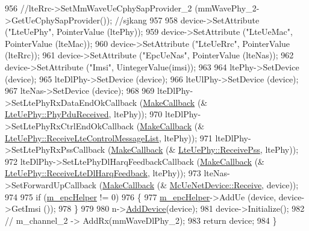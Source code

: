 \begin{DoxyCode}
956         \textcolor{comment}{//lteRrc->SetMmWaveUeCphySapProvider\_2 (mmWavePhy\_2->GetUeCphySapProvider()); //sjkang}
957 
958         device->SetAttribute (\textcolor{stringliteral}{"LteUePhy"}, PointerValue (ltePhy));
959         device->SetAttribute (\textcolor{stringliteral}{"LteUeMac"}, PointerValue (lteMac));
960         device->SetAttribute (\textcolor{stringliteral}{"LteUeRrc"}, PointerValue (lteRrc));
961         device->SetAttribute (\textcolor{stringliteral}{"EpcUeNas"}, PointerValue (lteNas));
962         device->SetAttribute (\textcolor{stringliteral}{"Imsi"}, UintegerValue(imsi));
963 
964         ltePhy->SetDevice (device);
965         lteDlPhy->SetDevice (device);
966         lteUlPhy->SetDevice (device);
967         lteNas->SetDevice (device);
968 
969         lteDlPhy->SetLtePhyRxDataEndOkCallback (\hyperlink{group__makecallbackmemptr_ga9376283685aa99d204048d6a4b7610a4}{MakeCallback} (&
      \hyperlink{classns3_1_1LteUePhy_ac78ec37217590a6cec1e0ca89f7014f9}{LteUePhy::PhyPduReceived}, ltePhy));
970         lteDlPhy->SetLtePhyRxCtrlEndOkCallback (\hyperlink{group__makecallbackmemptr_ga9376283685aa99d204048d6a4b7610a4}{MakeCallback} (&
      \hyperlink{classns3_1_1LteUePhy_aa7bd315ac9c8f49652624c8d1f1b03ef}{LteUePhy::ReceiveLteControlMessageList}, ltePhy));
971         lteDlPhy->SetLtePhyRxPssCallback (\hyperlink{group__makecallbackmemptr_ga9376283685aa99d204048d6a4b7610a4}{MakeCallback} (&
      \hyperlink{classns3_1_1LteUePhy_a2727abdb8f0559d6bc67349d9089723d}{LteUePhy::ReceivePss}, ltePhy));
972         lteDlPhy->SetLtePhyDlHarqFeedbackCallback (\hyperlink{group__makecallbackmemptr_ga9376283685aa99d204048d6a4b7610a4}{MakeCallback} (&
      \hyperlink{classns3_1_1LteUePhy_a46e7ead3dd806585ba62afdda8b90bb2}{LteUePhy::ReceiveLteDlHarqFeedback}, ltePhy));
973         lteNas->SetForwardUpCallback (\hyperlink{group__makecallbackmemptr_ga9376283685aa99d204048d6a4b7610a4}{MakeCallback} (&
      \hyperlink{classns3_1_1McUeNetDevice_ad4fd6a0c68cb71e07a6bc4921f12fb7e}{McUeNetDevice::Receive}, device));
974 
975         \textcolor{keywordflow}{if} (\hyperlink{classns3_1_1MmWaveHelper_a03b33f9a2480a4cdd8ffe697ccc08e9e}{m\_epcHelper} != 0)
976         \{
977                 \hyperlink{classns3_1_1MmWaveHelper_a03b33f9a2480a4cdd8ffe697ccc08e9e}{m\_epcHelper}->AddUe (device, device->GetImsi ());
978         \}
979 
980         n->\hyperlink{classns3_1_1Node_a42ff83ee1d5d1649c770d3f5b62375de}{AddDevice}(device);
981         device->Initialize();
982 \textcolor{comment}{//      m\_channel\_2 -> AddRx(mmWaveDlPhy\_2);}
983         \textcolor{keywordflow}{return} device;
984 \}
\end{DoxyCode}


